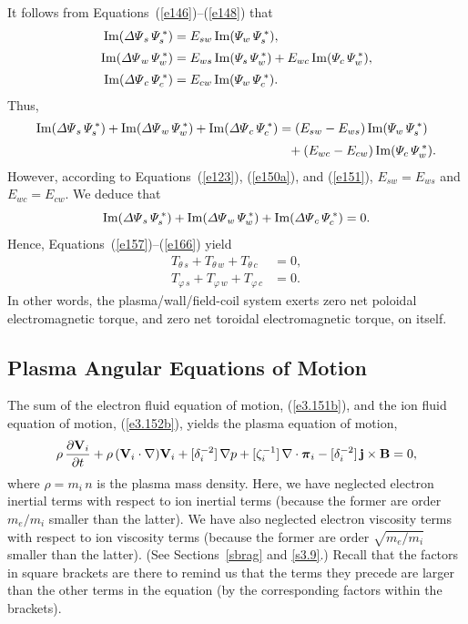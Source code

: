 \documentclass[notitlepage,12pt]{article}
\newcommand{\bpi}{\mbox{\boldmath$\pi$}}
\begin{document}
It follows from Equations~(\ref{e146})--(\ref{e148}) that
\begin{align}
{\rm Im}({\mit\Delta\Psi}_s\,{\mit\Psi}_s^{\,\ast}) &= E_{sw}\,{\rm Im}({\mit\Psi}_w\,{\mit\Psi}_s^{\,\ast}),\\[0.5ex]
{\rm Im}({\mit\Delta\Psi}_w\,{\mit\Psi}_w^{\,\ast}) &= E_{ws}\,{\rm Im}({\mit\Psi}_s\,{\mit\Psi}_w^{\,\ast})+E_{wc}\,{\rm Im}({\mit\Psi}_c\,{\mit\Psi}_w^{\,\ast}),\\[0.5ex]
 {\rm Im}({\mit\Delta\Psi}_c\,{\mit\Psi}_c^{\,\ast}) &=E_{cw}\,{\rm Im}({\mit\Psi}_w\,{\mit\Psi}_c^{\,\ast}).
 \end{align}
 Thus,
 \begin{align}
 {\rm Im}({\mit\Delta\Psi}_s\,{\mit\Psi}_s^{\,\ast})+ {\rm Im}({\mit\Delta\Psi}_w\,{\mit\Psi}_w^{\,\ast}) + {\rm Im}({\mit\Delta\Psi}_c\,{\mit\Psi}_c^{\,\ast}) & = (E_{sw}-E_{ws})\,{\rm Im}({\mit\Psi}_w\,{\mit\Psi}_s^{\,\ast}) \nonumber\\[0.5ex]
 &\phantom{=}+ (E_{wc}-E_{cw})\,{\rm Im}({\mit\Psi}_c\,{\mit\Psi}_w^{\,\ast}).
 \end{align}
 However, according to Equations~(\ref{e123}), (\ref{e150a}), and (\ref{e151}), $E_{sw}=E_{ws}$ and 
 $E_{wc}=E_{cw}$.
We deduce that
 \begin{equation} 
  {\rm Im}({\mit\Delta\Psi}_s\,{\mit\Psi}_s^{\,\ast})+ {\rm Im}({\mit\Delta\Psi}_w\,{\mit\Psi}_w^{\,\ast}) + {\rm Im}({\mit\Delta\Psi}_c\,{\mit\Psi}_c^{\,\ast})=0.
  \end{equation}
Hence, Equations~(\ref{e157})--(\ref{e166})   yield
\begin{align}
T_{\theta\,s} + T_{\theta\,w}+T_{\theta\,c} &= 0,\\[0.5ex]
T_{\varphi\,s} + T_{\varphi\,w}+T_{\varphi\,c} &= 0.
\end{align}
In other words, the plasma/wall/field-coil system exerts zero net poloidal electromagnetic torque, and zero net toroidal electromagnetic
torque, on itself. 

\subsection{Plasma Angular Equations of Motion}
The sum of the electron fluid equation of motion, (\ref{e3.151b}), and the ion fluid equation of motion, (\ref{e3.152b}), yields the plasma equation of motion, 
\begin{equation}
\rho\,\frac{\partial  {\bf V}_i}{\partial t} +
\rho\,({\bf V}_i\cdot\nabla) {\bf V}_i +
 [\delta_i^{-2}]\,\nabla p + 
[\zeta_i^{-1}]\,\nabla\cdot \bpi_i-[\delta_i^{-2}]\,{\bf j}\times {\bf B} =0,\label{e175}
\end{equation}
where $\rho=m_i\,n$ is the plasma mass density.
Here, we have neglected electron inertial terms with respect to ion inertial terms (because the
former are order $m_e/m_i$ smaller than the latter). We have also neglected electron viscosity terms
with respect to ion viscosity terms (because the
former are order $\sqrt{m_e/m_i}$ smaller than the latter). (See Sections~\ref{sbrag} and \ref{s3.9}.) Recall that the factors in square brackets are there to remind us that the terms they precede are larger than the
other terms in the equation (by the corresponding factors within the brackets). 
\end{document}
